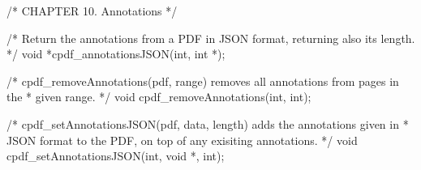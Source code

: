 /* CHAPTER 10. Annotations */

/* Return the annotations from a PDF in JSON format, returning also its length.
 */
void *cpdf_annotationsJSON(int, int *);

/* cpdf_removeAnnotations(pdf, range) removes all annotations from pages in the
 * given range. */
void cpdf_removeAnnotations(int, int);

/* cpdf_setAnnotationsJSON(pdf, data, length) adds the annotations given in
 * JSON format to the PDF, on top of any exisiting annotations. */
void cpdf_setAnnotationsJSON(int, void *, int);

